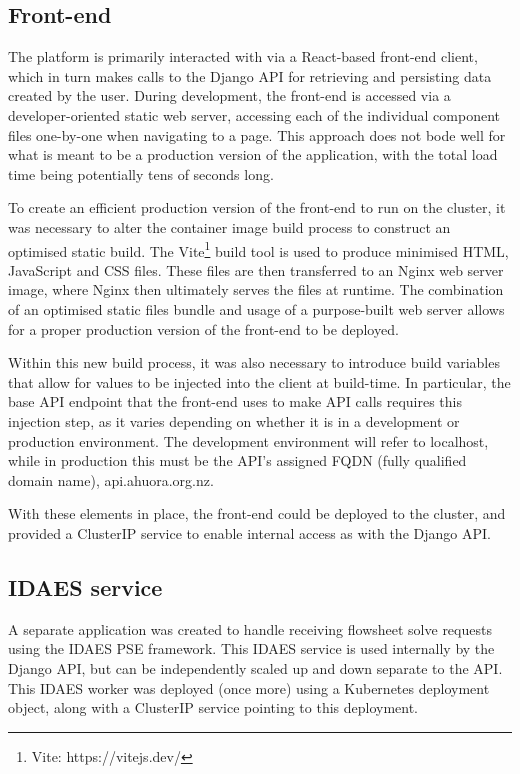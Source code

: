 

\subsection{Front-end}

The platform is primarily interacted with via a React-based front-end client, which in turn makes calls to the Django API for retrieving and persisting data created by the user. During development, the front-end is accessed via a developer-oriented static web server, accessing each of the individual component files one-by-one when navigating to a page. This approach does not bode well for what is meant to be a production version of the application, with the total load time being potentially tens of seconds long.

To create an efficient production version of the front-end to run on the cluster, it was necessary to alter the container image build process to construct an optimised static build. The Vite\footnote{Vite: https://vitejs.dev/} build tool is used to produce minimised HTML, JavaScript and CSS files. These files are then transferred to an Nginx web server image, where Nginx then ultimately serves the files at runtime. The combination of an optimised static files bundle and usage of a purpose-built web server allows for a proper production version of the front-end to be deployed.

Within this new build process, it was also necessary to introduce build variables that allow for values to be injected into the client at build-time. In particular, the base API endpoint that the front-end uses to make API calls requires this injection step, as it varies depending on whether it is in a development or production environment. The development environment will refer to localhost, while in production this must be the API's assigned FQDN (fully qualified domain name), api.ahuora.org.nz.

With these elements in place, the front-end could be deployed to the cluster, and provided a ClusterIP service to enable internal access as with the Django API.

\subsection{IDAES service}

A separate application was created to handle receiving flowsheet solve requests using the IDAES PSE framework. This IDAES service is used internally by the Django API, but can be independently scaled up and down separate to the API. This IDAES worker was deployed (once more) using a Kubernetes deployment object, along with a ClusterIP service pointing to this deployment.

